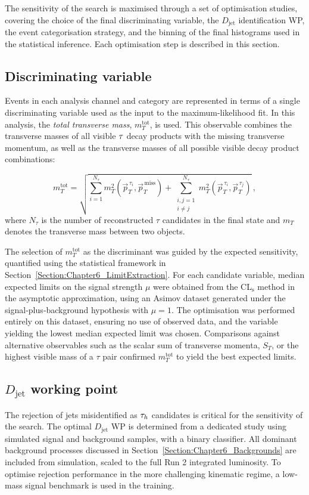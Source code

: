 The sensitivity of the search is maximised through a set of optimisation studies, covering the choice of the final discriminating variable, the $D_{\text{jet}}$ identification \ac{WP}, the event categorisation strategy, and the binning of the final histograms used in the statistical inference. Each optimisation step is described in this section.

\subsection{Discriminating variable}
Events in each analysis channel and category are represented in terms of a single discriminating variable used as the input to the maximum-likelihood fit. In this analysis, the \textit{total transverse mass}, $m_T^\mathrm{tot}$, is used. This observable combines the transverse masses of all visible $\tau$ decay products with the missing transverse momentum, as well as the transverse masses of all possible visible decay product combinations:

\begin{equation}
m_T^\mathrm{tot} =
\sqrt{ \sum_{i=1}^{N_\tau} m_T^2(\vec{p}_{T}^{\,\tau_i}, \vec{p}_T^{\,\text{miss}}) 
+ \sum_{\substack{i,j=1 \\ i\neq j}}^{N_\tau} m_T^2(\vec{p}_T^{\,\tau_i}, \vec{p}_T^{\,\tau_j}) } \, ,
\end{equation}
where $N_\tau$ is the number of reconstructed $\tau$ candidates in the final state and $m_T$ denotes the transverse mass between two objects.  

The selection of $m_T^\mathrm{tot}$ as the discriminant was guided by the expected sensitivity, quantified using the statistical framework in Section~\ref{Section:Chapter6_LimitExtraction}. For each candidate variable, median expected limits on the signal strength $\mu$ were obtained from the CL$_\mathrm{s}$ method in the asymptotic approximation, using an Asimov dataset generated under the signal‑plus‑background hypothesis with $\mu = 1$. The optimisation was performed entirely on this dataset, ensuring no use of observed data, and the variable yielding the lowest median expected limit was chosen. Comparisons against alternative observables such as the scalar sum of transverse momenta, $S_T$, or the highest visible mass of a $\tau$ pair confirmed $m_T^\mathrm{tot}$ to yield the best expected limits.

\subsection{\texorpdfstring{$D_{\text{jet}}$}{Djet} working point}
The rejection of jets misidentified as $\tau_h$ candidates is critical for the sensitivity of the search. The optimal $D_{\text{jet}}$ \ac{WP} is determined from a dedicated study using simulated signal and background samples, with a binary classifier. All dominant background processes discussed in Section~\ref{Section:Chapter6_Backgrounds} are included from simulation, scaled to the full Run 2 integrated luminosity. To optimise rejection performance in the more challenging kinematic regime, a low-mass signal benchmark is used in the training.  


